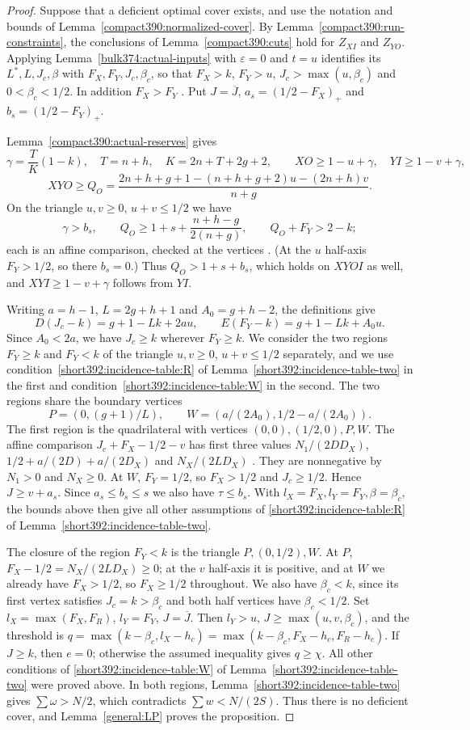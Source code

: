 \begin{proof}
Suppose that a deficient optimal cover exists, and use the notation and bounds of Lemma~\ref{compact390:normalized-cover}. By Lemma~\ref{compact390:run-constraints}, the conclusions of Lemma~\ref{compact390:cuts} hold for $Z_{XI}$ and $Z_{YO}$.
Applying Lemma~\ref{bulk374:actual-inputs} with
$\varepsilon=0$ and $t=u$ identifies its $L^*,L,J_c,\beta$ with
$F_X,F_Y,J_c,\beta_c$, so that
$F_X>k$, $F_Y>u$, $J_c>\max(u,\beta_c)$ and
$0<\beta_c<1/2$.
In addition $F_X>F_Y$ .
Put $J=\overline J$, $a_s=(1/2-F_X)_+$ and $b_s=(1/2-F_Y)_+$.

Lemma~\ref{compact390:actual-reserves} gives
\[
 \gamma=\frac{T}{K}(1-k),\quad T=n+h,\quad K=2n+T+2g+2,
 \qquad XO\ge1-u+\gamma,\quad YI\ge1-v+\gamma,
\]
\[
 XYO\ge Q_O=\frac{2n+h+g+1-(n+h+g+2)u-(2n+h)v}{n+g}.
\]
On the triangle $u,v\ge0$, $u+v\le1/2$ we have
\[
 \gamma>b_s,\qquad Q_O\ge1+s+\frac{n+h-g}{2(n+g)},\qquad Q_O+F_Y>2-k;
\]
each is an affine comparison, checked at the vertices . (At the
$u$ half-axis $F_Y>1/2$, so there $b_s=0$.) Thus $Q_O>1+s+b_s$, which holds on $XYOI$ as well, and
$XYI\ge1-v+\gamma$ follows from $YI$.

Writing $a=h-1$, $L=2g+h+1$ and $A_0=g+h-2$, the definitions give
\[
 D(J_c-k)=g+1-Lk+2au,\qquad
 E(F_Y-k)=g+1-Lk+A_0u.
\]
Since $A_0<2a$, we have $J_c\ge k$ wherever $F_Y\ge k$.
We consider the two regions $F_Y\ge k$ and $F_Y<k$ of the triangle $u,v\ge0$, $u+v\le1/2$ separately, and we use condition~\ref{short392:incidence-table:R} of Lemma~\ref{short392:incidence-table-two} in the first and condition~\ref{short392:incidence-table:W} in the second. The two regions share the boundary vertices
\[
 P=(0,(g+1)/L),\qquad
 W=(a/(2A_0),1/2-a/(2A_0)).
\]
The first region is the quadrilateral with vertices $(0,0),(1/2,0),P,W$.
The affine comparison $J_c+F_X-1/2-v$ has first three values
$N_1/(2DD_X)$, $1/2+a/(2D)+a/(2D_X)$ and $N_X/(2LD_X)$ .
They are nonnegative by $N_1>0$ and $N_X\ge0$. At $W$,
$F_Y=1/2$, so $F_X>1/2$ and $J_c\ge1/2$. Hence $J\ge v+a_s$.
Since $a_s\le b_s\le s$ we also have $\tau\le b_s$. With
$l_X=F_X,l_Y=F_Y,\beta=\beta_c$, the bounds above then give all other
assumptions of \ref{short392:incidence-table:R} of Lemma~\ref{short392:incidence-table-two}.

The closure of the region $F_Y<k$ is the triangle $P,(0,1/2),W$. At $P$,
$F_X-1/2=N_X/(2LD_X)\ge0$; at the $v$ half-axis it is positive, and at $W$ we already have $F_X>1/2$, so
$F_X\ge1/2$ throughout.
We also have $\beta_c<k$, since its first vertex satisfies $J_c=k>\beta_c$
and both half vertices have $\beta_c<1/2$.
Set $l_X=\max(F_X,F_R)$, $l_Y=F_Y$, $J=\overline J$.
Then $l_Y>u$, $J\ge\max(u,v,\beta_c)$, and the threshold is $q=\max(k-\beta_c,l_X-h_c) =\max(k-\beta_c,F_X-h_c,F_R-h_c)$. If $J\ge k$, then $e=0$; otherwise the assumed inequality gives
$q\ge\chi$. All other conditions of \ref{short392:incidence-table:W} of Lemma~\ref{short392:incidence-table-two} were proved above.
In both regions, Lemma~\ref{short392:incidence-table-two} gives $\sum\omega>N/2$, which contradicts $\sum w<N/(2S)$. Thus there is no deficient cover, and
Lemma~\ref{general:LP} proves the proposition.
\end{proof}


